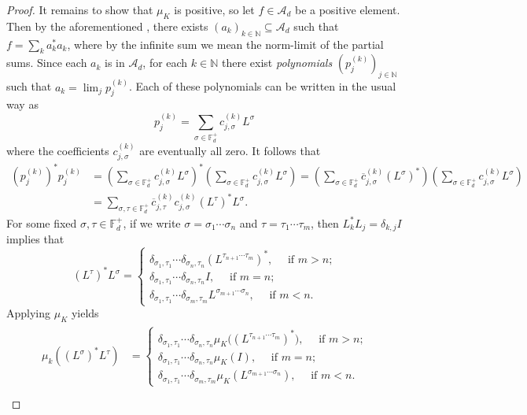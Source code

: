 \documentclass[11pt,reqno]{amsart}
\def\s{\sigma}
\def\t{\tau}
\def\d{\delta}
\def\NN{\mathbb{N}}
\def\FF{\mathbb{F}}
\def\cA{\mathcal{A}}
\def\scrA{\mathscr{A}}
\theoremstyle{definition}
\numberwithin{equation}{section}
\begin{document}
\begin{proof}
    It remains to show that \(\mu_K\) is positive, so let \(f \in \scrA_d\) be a positive element. Then by the aforementioned \cite[Lemma 4.6]{JM17}, there exists \((a_k)_{k \in \NN} \subseteq \cA_d\) such that \(f = \sum_k a_k^* a_k\), where by the infinite sum we mean the norm-limit of the partial sums. Since each \(a_k\) is in \(\cA_d\), for each \(k \in \NN\) there exist \emph{polynomials} \((p^{(k)}_j)_{j \in \NN}\) such that \(a_k = \lim_j p^{(k)}_{j}\). Each of these polynomials can be written in the usual way as
    \[
        p^{(k)}_{j} = \sum_{\s \in \FF_d^+} c^{(k)}_{j,\s} L^\s
    \]
    where the coefficients \(c^{(k)}_{j,\s}\) are eventually all zero. It follows that
    \begin{align*}
        \left(p^{(k)}_{j}\right)^* p^{(k)}_{j} & = \left( \sum_{\s \in \FF_d^+} c^{(k)}_{j,\s} L^\s \right)^* \left( \sum_{\s \in \FF_d^+} c^{(k)}_{j,\s} L^\s \right) = \left( \sum_{\s \in \FF_d^+} \overline{c}^{(k)}_{j,\s} (L^\s)^* \right)\left( \sum_{\s \in \FF_d^+} c^{(k)}_{j,\s} L^\s \right) \\
        & = \sum_{\s, \t \in \FF_d^+} \overline{c}^{(k)}_{j,\t} c^{(k)}_{j,\s} (L^\t)^* L^\s.
    \end{align*}
    For some fixed \(\s,\t \in \FF_d^+\), if we write \(\s = \s_1 \cdots \s_n\) and \(\t = \t_1 \cdots \t_m\), then \(L_k^*L_j = \d_{k,j} I\) implies that
    \[
        (L^\t)^* L^\s = \begin{cases} \d_{\s_1, \t_1} \cdots \d_{\s_n, \t_n} (L^{\t_{n+1}\cdots\t_m})^*, \quad \text{ if \(m > n\);} \\ \d_{\s_1, \t_1} \cdots \d_{\s_n, \t_n}I, \quad \text{ if \(m = n\);} \\ \d_{\s_1, \t_1} \cdots \d_{\s_m, \t_m} L^{\s_{m+1}\cdots\s_n}, \quad \text{ if \(m < n\).}\end{cases}
    \]
    Applying \(\mu_K\) yields
    \begin{align}
    \label{eqn:MomentCases}
        \begin{split}
        \mu_k((L^\s)^* L^\t) & = \begin{cases} \d_{\s_1, \t_1} \cdots \d_{\s_n, \t_n} \mu_K\big((L^{\t_{n+1}\cdots\t_m})^*\big), \quad \text{ if \(m > n\);} \\ \d_{\s_1, \t_1} \cdots \d_{\s_n, \t_n}\mu_K(I), \quad \text{ if \(m = n\);} \\ \d_{\s_1, \t_1} \cdots \d_{\s_m, \t_m} \mu_K(L^{\s_{m+1}\cdots\s_n}), \quad \text{ if \(m < n\).}\end{cases} \\

\end{split}
\end{align}
\end{proof}
\end{document}

